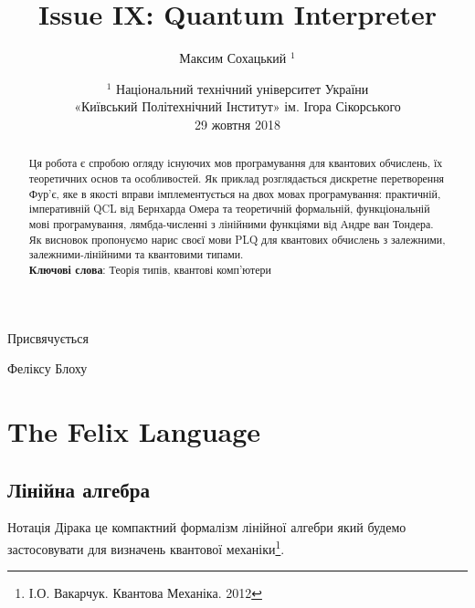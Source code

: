 \documentclass{article}
\theoremstyle{definition}
\begin{document}
\title{Issue IX: Quantum Interpreter}
\author{Максим Сохацький $^1$}
\date{ \small $^1$ Національний технічний університет України \\
       «Київський Політехнічний Інститут» ім. Ігора Сікорського \\
       29 жовтня 2018 }
\maketitle

\begin{abstract}
Ця робота є спробою огляду існуючих мов програмування для квантових обчислень,
їх теоретичних основ та особливостей.
Як приклад розглядається дискретне перетворення Фур'є,
яке в якості вправи імплементується на двох мовах програмування:
практичній, імперативній QCL від Бернхарда Омера\cite{Omer2003} та
теоретичній формальній, функціональній мові програмування, лямбда-численні
з лінійними функціями від Андре ван Тондера\cite{Tonder2004}. Як висновок
пропонуємо нарис своєї мови PLQ для квантових обчислень з залежними,
залежними-лінійними та квантовими типами.
\\
{\bf Ключові слова}: Теорія типів, квантові комп'ютери
\end{abstract}

\ifincludeTOC
  \tableofcontents
\fi

\newpage

\epigraph{Присвячується}{Феліксу Блоху}

\section{The Felix Language}

\subsection{Лінійна алгебра}
Нотація Дірака це компактний формалізм лінійної алгебри який будемо застосовувати
для визначень квантової механіки\footnote{І.О. Вакарчук. Квантова Механіка. 2012}.
\end{document}
